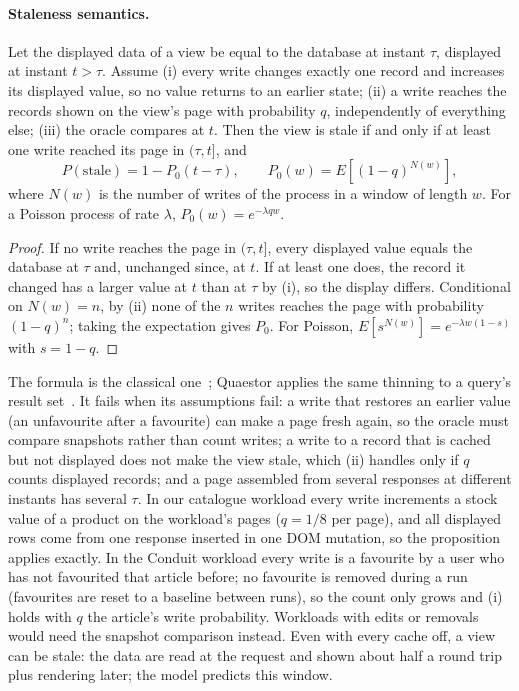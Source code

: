 \documentclass[acmsmall,review,nonacm]{acmart}
\begin{document}
\paragraph{Staleness semantics.}
\begin{proposition}
\label{prop:stale}
Let the displayed data of a view be equal to the database at instant $\tau$, displayed at instant $t>\tau$. Assume (i) every write changes exactly one record and increases its displayed value, so no value returns to an earlier state; (ii) a write reaches the records shown on the view's page with probability $q$, independently of everything else; (iii) the oracle compares at $t$. Then the view is stale if and only if at least one write reached its page in $(\tau,t]$, and
\[ P(\text{stale}) = 1 - P_0(t-\tau), \qquad P_0(w) = E\!\left[(1-q)^{N(w)}\right], \]
where $N(w)$ is the number of writes of the process in a window of length $w$. For a Poisson process of rate $\lambda$, $P_0(w)=e^{-\lambda q w}$.
\end{proposition}
\begin{proof}
If no write reaches the page in $(\tau,t]$, every displayed value equals the database at $\tau$ and, unchanged since, at $t$. If at least one does, the record it changed has a larger value at $t$ than at $\tau$ by (i), so the display differs. Conditional on $N(w)=n$, by (ii) none of the $n$ writes reaches the page with probability $(1-q)^n$; taking the expectation gives $P_0$. For Poisson, $E[s^{N(w)}]=e^{-\lambda w (1-s)}$ with $s=1-q$.
\end{proof}
The formula is the classical one~\cite{cho2000freshness}; Quaestor applies the same thinning to a query's result set~\cite{gessert2017quaestor}. It fails when its assumptions fail: a write that restores an earlier value (an unfavourite after a favourite) can make a page fresh again, so the oracle must compare snapshots rather than count writes; a write to a record that is cached but not displayed does not make the view stale, which (ii) handles only if $q$ counts displayed records; and a page assembled from several responses at different instants has several $\tau$. In our catalogue workload every write increments a stock value of a product on the workload's pages ($q = 1/8$ per page), and all displayed rows come from one response inserted in one DOM mutation, so the proposition applies exactly. In the Conduit workload every write is a favourite by a user who has not favourited that article before; no favourite is removed during a run (favourites are reset to a baseline between runs), so the count only grows and (i) holds with $q$ the article's write probability. Workloads with edits or removals would need the snapshot comparison instead. Even with every cache off, a view can be stale: the data are read at the request and shown about half a round trip plus rendering later; the model predicts this window.
\end{document}
